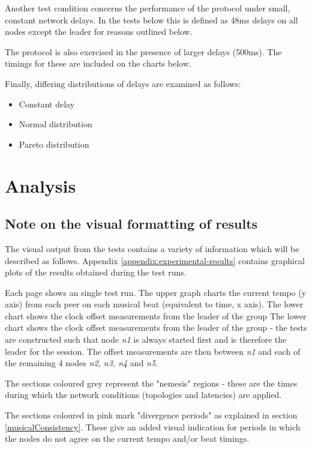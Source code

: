 \documentclass[11pt]{article} %
\theoremstyle{plain}
\theoremstyle{definition}
\begin{document}
Another test condition concerns the performance of the protocol under small,
constant network delays. In the tests below this is defined as 48ms delays on
all nodes except the leader for reasons outlined below.

The protocol is also exercised in the presence of larger delays (500ms). The
timings for these are included on the charts below.

Finally, differing distributions of delays are examined as follows:

\begin{itemize}
  \item Constant delay
  \item Normal distribution
  \item Pareto distribution
\end{itemize}

\section{Analysis}

\subsection{Note on the visual formatting of results}

The visual output from the tests contains a variety of information which will
be described as follows. Appendix \ref{appendix:experimental-results} contains
graphical plots of the results obtained during the test runs.

Each page shows an single test run. The upper graph charts the current tempo (y
axis) from each peer on each musical beat (equivalent to time, x axis). The
lower chart shows the clock offset measurements from the leader of the group
The lower chart shows the clock offset measurements from the leader of the
group - the tests are constructed such that node \textit{n1} is always started
first and is therefore the leader for the session. The offset measurements are
then between \textit{n1} and each of the remaining 4 nodes \textit{n2, n3, n4}
and \textit{n5}.

The sections coloured grey represent the "nemesis" regions - these are the
times during which the network conditions (topologies and latencies) are
applied.

The sections coloured in pink mark "divergence periods" as explained in section
\ref{musicalConsistency}. These give an added visual indication for periods in
which the nodes do not agree on the current tempo and/or beat timings.
\end{document}
